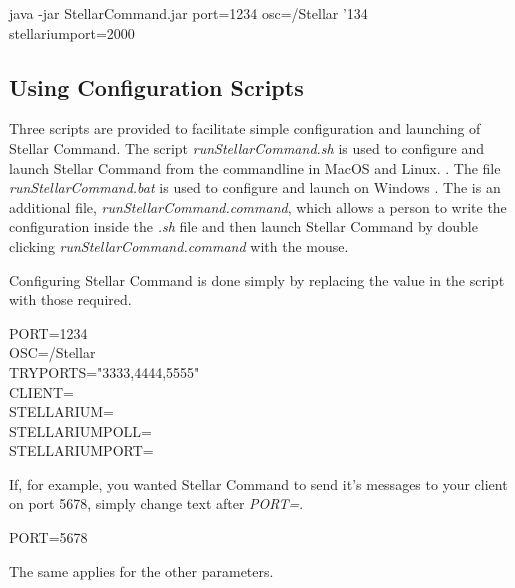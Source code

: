 \begin{syntax} 
	\medskip
	java -jar StellarCommand.jar port=1234 osc=/Stellar  {\char'134}\\stellariumport=2000 
	\medskip
\end{syntax}
\bigskip


\subsection{Using Configuration Scripts}\label{sec:configscript}
Three scripts are provided to facilitate simple configuration and launching of  Stellar Command. The script \textit{runStellarCommand.sh} is used to configure and launch Stellar Command from the commandline in MacOS and Linux.   . The file \textit{runStellarCommand.bat} is used to configure and launch on Windows  . The is an additional file, \textit{runStellarCommand.command}, which allows a person to write the configuration inside the \textit{.sh} file and then launch Stellar Command by double clicking \textit{runStellarCommand.command} with the mouse.

Configuring Stellar Command is done simply by replacing the value in the script with those required.
 \begin{syntax} 
	\medskip
PORT=1234\\
OSC=/Stellar\\
TRYPORTS="3333,4444,5555"\\
CLIENT=\\
STELLARIUM=\\ 
STELLARIUMPOLL=\\
STELLARIUMPORT=\\
	\medskip
\end{syntax}
\bigskip

If, for example, you wanted Stellar Command to send it's messages to your client on port 5678, simply change text after  \textit{PORT=}.
 \begin{syntax} 
	\medskip
	PORT=5678\\
	\medskip
\end{syntax}
\bigskip

The same applies for the other parameters.

